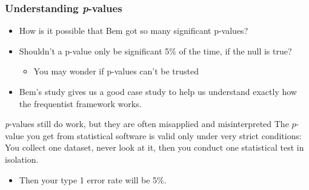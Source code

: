 \documentclass[10pt, block=fill]{beamer}
\begin{document}
\begin{frame}
  \frametitle{Understanding \textit{p}-values}
  
  \begin{itemize}
    \item How is it possible that Bem got so many significant p-values?
    \item Shouldn't a p-value only be significant 5\% of the time, if the null is true?
    \begin{itemize}
        \item You may wonder if p-values can't be trusted
    \end{itemize}
    \item Bem's study gives us a good case study to help us understand exactly how the frequentist framework works.
  \end{itemize}
  
  \begin{block}{\textit{p}-values still do work, but they are often misapplied and misinterpreted}
    The $p$-value you get from statistical software is valid only under very strict conditions: You collect one dataset, never look at it, then you conduct one statistical test in isolation.
    \begin{itemize}
      \item Then your type 1 error rate will be 5\%.
    \end{itemize}
  \end{block}


    
\end{frame}
\end{document}
